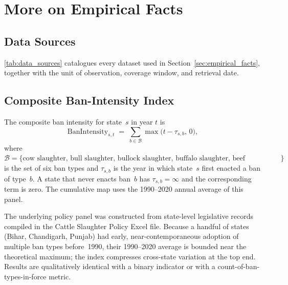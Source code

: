 
\appendix
\renewcommand{\thesection}{\Alph{section}}
\renewcommand{\thesubsection}{\Alph{section}.\arabic{subsection}}
\renewcommand{\thetable}{A.\arabic{table}}
\renewcommand{\thefigure}{A.\arabic{figure}}
\setcounter{table}{0}
\setcounter{figure}{0}

\section{More on Empirical Facts} \label{app:more_empirical_facts}

\subsection{Data Sources} \label{app:data_sources}

\autoref{tab:data_sources} catalogues every dataset used in
Section~\ref{sec:empirical_facts}, together with the unit of observation,
coverage window, and retrieval date.

\subsection{Composite Ban-Intensity Index} \label{app:ban_intensity}

The composite ban intensity for state~$s$ in year $t$ is
\begin{equation*}
\text{BanIntensity}_{s,t}
\;=\;\sum_{b\in\mathcal{B}} \max\!\big(t-\tau_{s,b},\,0\big),
\end{equation*}
where $\mathcal{B}=\{\text{cow slaughter, bull slaughter, bullock slaughter,
buffalo slaughter, beef possession, beef sales}\}$ is the set of six ban
types and $\tau_{s,b}$ is the year in which state~$s$ first enacted a ban of
type~$b$. A state that never enacts ban~$b$ has $\tau_{s,b}=\infty$ and the
corresponding term is zero. The cumulative map uses the
1990--2020 annual average of this panel.

The underlying policy panel was constructed from state-level legislative
records compiled in the Cattle Slaughter Policy Excel file. Because a handful of states (Bihar, Chandigarh,
Punjab) had early, near-contemporaneous adoption of multiple ban types
before~1990, their 1990--2020 average is bounded near the theoretical
maximum; the index compresses cross-state variation at the top end. Results
are qualitatively identical with a binary indicator or with a
count-of-ban-types-in-force metric.

